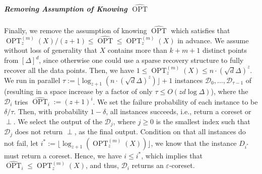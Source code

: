 \documentclass[letterpaper,11pt]{article}
\theoremstyle{plain}
\theoremstyle{definition}
\theoremstyle{remark}
\DeclareMathOperator{\OPT}{OPT}
\newcommand{\GOPT}{\widehat{\OPT}}
\newcommand{\eps}{\varepsilon}
\newcommand{\calD}{\mathcal{D}}
\begin{document}
\subparagraph{Removing Assumption of Knowing $\GOPT$}
Finally, we remove the assumption of knowing $\GOPT$ which satisfies that $\OPT_z^{(m)}(X)/(z+1)\le \GOPT\le \OPT_z^{(m)}(X)$ in advance.
We assume without loss of generality that $X$ contains more than $k + m + 1$ distinct points from $[\Delta]^d$, since otherwise one could use a sparse recovery structure to fully recover all the data points.
Then, we have $1\le \OPT^{(m)}_z(X)\le n\cdot (\sqrt d \Delta)^z$.
We run in parallel $\tau:=\lfloor \log_{z+1}(n\cdot (\sqrt d \Delta)^z)\rfloor + 1$ instances $\calD_0,\dots,\calD_{\tau-1}$ of~ (resulting in a space increase by a factor of only $\tau \le O(zd\log\Delta)$), where the $\calD_i$ tries $\GOPT_i:=(z+1)^i$. 
We set the failure probability of each instance to be $\delta/\tau$.
Then, with probability $1-\delta$, all instances succeeds, i.e., return a coreset or $\perp$.
We select the output of the $\calD_j$, where $j\ge 0$ is the smallest index such that $\calD_j$ does not return $\perp$, as the final output. 
Condition on that all instances do not fail, 
let $i^* := \lfloor \log_{z+1}(\OPT_z^{(m)}(X)) \rfloor$, we know that the instance $D_{i^*}$ must return a coreset.
Hence, we have $i\le i^*$, which implies that $\GOPT_i\le \OPT_z^{(m)}(X)$, and thus, $\calD_i$ returns an $\eps$-coreset.





































    











 
\end{document}
